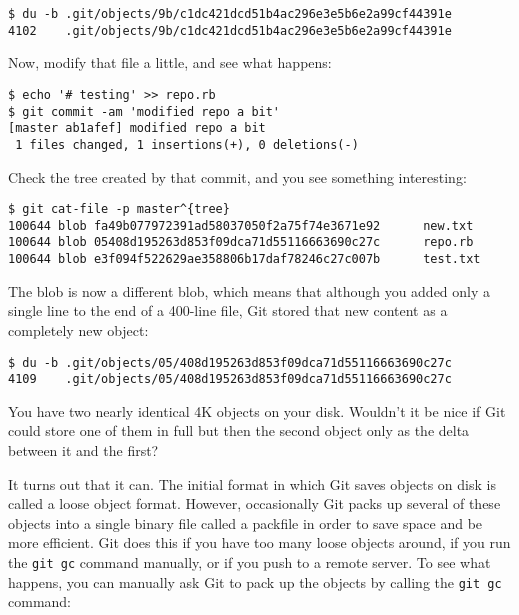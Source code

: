 \documentclass[a4paper]{book}
\begin{document}
\begin{shaded}\begin{verbatim}
$ du -b .git/objects/9b/c1dc421dcd51b4ac296e3e5b6e2a99cf44391e
4102	.git/objects/9b/c1dc421dcd51b4ac296e3e5b6e2a99cf44391e
\end{verbatim}\end{shaded}

Now, modify that file a little, and see what happens:

\begin{shaded}\begin{verbatim}
$ echo '# testing' >> repo.rb
$ git commit -am 'modified repo a bit'
[master ab1afef] modified repo a bit
 1 files changed, 1 insertions(+), 0 deletions(-)
\end{verbatim}\end{shaded}

Check the tree created by that commit, and you see something interesting:

\begin{shaded}\begin{verbatim}
$ git cat-file -p master^{tree}
100644 blob fa49b077972391ad58037050f2a75f74e3671e92      new.txt
100644 blob 05408d195263d853f09dca71d55116663690c27c      repo.rb
100644 blob e3f094f522629ae358806b17daf78246c27c007b      test.txt
\end{verbatim}\end{shaded}

The blob is now a different blob, which means that although you added only a single line to the end of a 400-line file, Git stored that new content as a completely new object:

\begin{shaded}\begin{verbatim}
$ du -b .git/objects/05/408d195263d853f09dca71d55116663690c27c
4109	.git/objects/05/408d195263d853f09dca71d55116663690c27c
\end{verbatim}\end{shaded}

You have two nearly identical 4K objects on your disk. Wouldn't it be nice if Git could store one of them in full but then the second object only as the delta between it and the first?

It turns out that it can. The initial format in which Git saves objects on disk is called a loose object format. However, occasionally Git packs up several of these objects into a single binary file called a packfile in order to save space and be more efficient. Git does this if you have too many loose objects around, if you run the \texttt{git gc} command manually, or if you push to a remote server. To see what happens, you can manually ask Git to pack up the objects by calling the \texttt{git gc} command:
\end{document}
